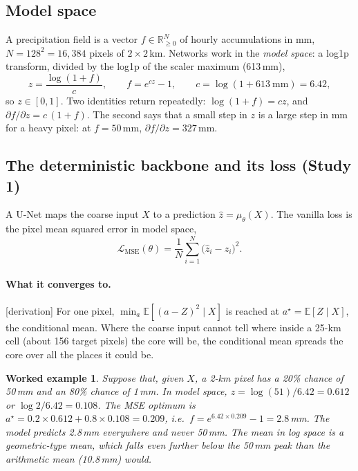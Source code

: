 \documentclass[11pt,a4paper]{article}
\newcommand{\R}{\mathbb{R}}
\newcommand{\E}{\mathbb{E}}
\newcommand{\status}[1]{\textsf{\small[#1]}}
\newtheorem*{example}{Worked example}
\begin{document}
\subsection{Model space}
A precipitation field is a vector $f\in\R_{\ge 0}^N$ of hourly accumulations in mm, $N = 128^2 = 16{,}384$ pixels of
$2\times 2$\,km. Networks work in the \emph{model space}: a log1p transform, divided by the log1p of the scaler maximum (613\,mm),
\begin{equation}\label{eq:z}
  z = \frac{\log(1+f)}{c},\qquad f = e^{cz}-1,\qquad c = \log(1+613\ \text{mm}) = 6.42 ,
\end{equation}
so $z\in[0,1]$. Two identities return repeatedly: $\log(1+f) = cz$, and $\partial f/\partial z = c\,(1+f)$. The second
says that a small step in $z$ is a large step in mm for a heavy pixel: at $f = 50$\,mm, $\partial f/\partial z = 327$\,mm.

\subsection{The deterministic backbone and its loss (Study 1)}
A U-Net maps the coarse input $X$ to a prediction $\hat z = \mu_\theta(X)$. The vanilla loss is the pixel mean squared
error in model space,
\begin{equation}\label{eq:mse}
  \mathcal L_{\mathrm{MSE}}(\theta) = \frac1N\sum_{i=1}^{N}\big(\hat z_i - z_i\big)^2 .
\end{equation}

\paragraph{What it converges to.} \status{derivation} For one pixel, $\min_{a}\E[(a - Z)^2\mid X]$ is reached at
$a^\star = \E[Z\mid X]$, the conditional mean. Where the coarse input cannot tell where inside a 25-km cell (about 156 target pixels) the
core will be, the conditional mean spreads the core over all the places it could be.

\begin{example}
Suppose that, given $X$, a 2-km pixel has a 20\% chance of 50\,mm and an 80\% chance of 1\,mm. In model space,
$z = \log(51)/6.42 = 0.612$ or $\log 2/6.42 = 0.108$. The MSE optimum is $a^\star = 0.2\times0.612 + 0.8\times0.108 =
0.209$, i.e.\ $f = e^{6.42\times0.209} - 1 = 2.8$\,mm. The model predicts 2.8\,mm everywhere and never 50\,mm. The
mean in log space is a geometric-type mean, which falls even further below the 50\,mm peak than the arithmetic mean
(10.8\,mm) would.
\end{example}
\end{document}
